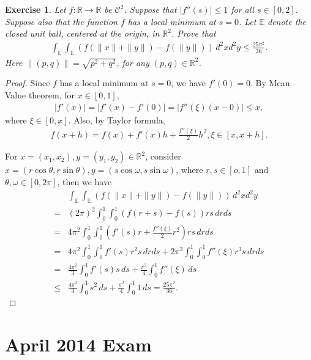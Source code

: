 \documentclass[11pt]{article}
\newtheorem{exercise}{Exercise}[section]
\theoremstyle{definition}
\numberwithin{equation}{subsection}
\begin{document}
\medskip

\begin{exercise}{\rm *}
Let $f: \mathbb{R} \to \mathbb{R}$ be $\mathcal{C}^2$. Suppose that $\left|f''(s) \right| \leq 1$ for all $s \in [0,2]$. Suppose also that the function $f$ has a local minimum at $s = 0$. Let $\mathbb{E}$ denote the closed unit ball, centered at the origin, in $\mathbb{R}^2$. Prove that
\begin{align*}
    \int_{\mathbb{E}} \int_{\mathbb{E}} \left(f(\|x\| + \|y\|) - f(\|y\|) \right)\, d^2x d^2y \leq \frac{25\pi^2}{36}.
\end{align*}
Here $\|(p,q)\| = \sqrt{p^2 + q^2}$, for any $(p,q) \in \mathbb{R}^2$.
\end{exercise}
\begin{proof}
Since $f$ has a local minimum at $s = 0$, we have $f'(0) = 0$. By Mean Value theorem, for $x \in [0,1]$,
\begin{align*}
    \left|f'(x)\right| = \left|f'(x) - f'(0)\right| = \left|f''(\xi) (x - 0) \right| \leq x,
\end{align*}
where $\xi \in [0,x]$. Also, by Taylor formula, 
\begin{align*}
    f(x + h) = f(x) + f'(x)h + \frac{f''(\xi)}{2}h^2, \xi \in [x, x+ h].
\end{align*}

For $x = (x_1, x_2), y = (y_1, y_2) \in \mathbb{R}^2$, consider $x = (r \cos \theta, r \sin \theta), y = (s \cos \omega, s \sin \omega)$, where $r, s \in [o,1]$ and $\theta, \omega \in [0,2\pi]$, then we have
\begin{align*}
    & \int_{\mathbb{E}} \int_{\mathbb{E}} \left(f(\|x\| + \|y\|) - f(\|y\|) \right)\, d^2x d^2y \\
    = & (2\pi)^2 \int^1_0 \int^1_0 \left( f(r + s) - f(s) \right) rs\, dr ds \\
    = & 4\pi^2 \int^1_0 \int^1_0 \left( f'(s)r + \frac{f''(\xi)}{2}r^2 \right)rs \, drds \\
    = & 4\pi^2 \int^1_0 \int^1_0 f'(s)r^2s \, drds + 2\pi^2 \int^1_0 \int^1_0 f''(\xi)r^3s\, drds \\
    = & \frac{4\pi^2}{3} \int^1_0 f'(s)s \, ds + \frac{\pi^2}{4} \int^1_0 f''(\xi) \, ds \\
    \leq & \frac{4\pi^2}{3} \int^1_0 s^2 \, ds + \frac{\pi^2}{4} \int^1_0 1 \, ds = \frac{25\pi^2}{36}.
\end{align*}
\end{proof}


\newpage
\section{April 2014 Exam}
\end{document}
